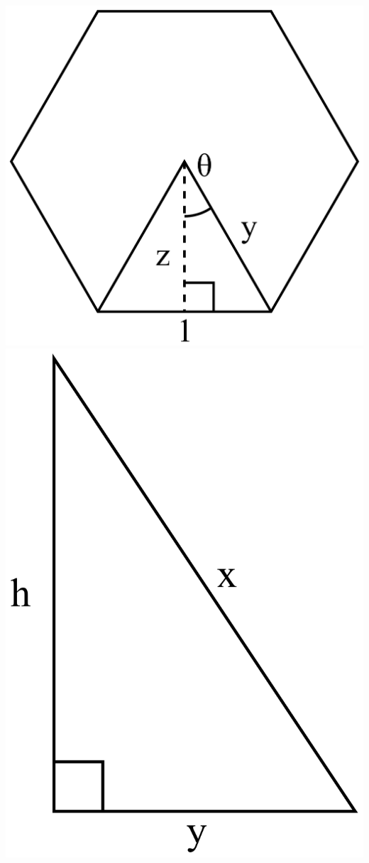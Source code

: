 \documentclass{article}
\begin{document}
\begin{center}
\includegraphics[scale=0.3]{polygon.png}
\hspace{0.5in}
\includegraphics[scale=0.3]{triangle2.png}
\end{center}
\vspace{0.15in}
\end{document}
